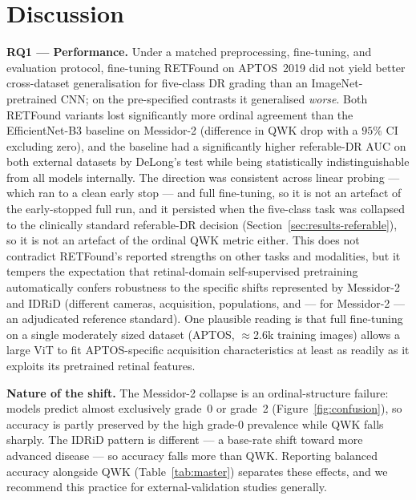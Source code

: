 \documentclass[journal]{IEEEtran}
\begin{document}
\section{Discussion}
\label{sec:discussion}

\textbf{RQ1 --- Performance.} Under a matched preprocessing, fine-tuning, and
evaluation protocol, fine-tuning RETFound on APTOS~2019 did not yield better
cross-dataset generalisation for five-class DR grading than an ImageNet-pretrained
CNN; on the pre-specified contrasts it generalised \emph{worse}. Both RETFound
variants lost significantly more ordinal agreement than the EfficientNet-B3
baseline on Messidor-2 (difference in QWK drop with a $95\%$ CI excluding zero),
and the baseline had a significantly higher referable-DR AUC on both external
datasets by DeLong's test while being statistically indistinguishable from all
models internally. The direction was consistent across linear probing --- which
ran to a clean early stop --- and full fine-tuning, so it is not an artefact of
the early-stopped full run, and it persisted when the five-class task was
collapsed to the clinically standard referable-DR decision
(Section~\ref{sec:results-referable}), so it is not an artefact of the ordinal
QWK metric either. This does not contradict RETFound's reported strengths
on other tasks and modalities, but it tempers the expectation that retinal-domain
self-supervised pretraining automatically confers robustness to the specific
shifts represented by Messidor-2 and IDRiD (different cameras, acquisition,
populations, and --- for Messidor-2 --- an adjudicated reference standard). One
plausible reading is that full fine-tuning on a single moderately sized dataset
(APTOS, $\approx$2.6k training images) allows a large ViT to fit APTOS-specific
acquisition characteristics at least as readily as it exploits its pretrained
retinal features.

\textbf{Nature of the shift.} The Messidor-2 collapse is an ordinal-structure
failure: models predict almost exclusively grade~0 or grade~2
(Figure~\ref{fig:confusion}), so accuracy is partly preserved by the high grade-0
prevalence while QWK falls sharply. The IDRiD pattern is different --- a base-rate
shift toward more advanced disease --- so accuracy falls more than QWK. Reporting
balanced accuracy alongside QWK (Table~\ref{tab:master}) separates these effects,
and we recommend this practice for external-validation studies generally.
\end{document}
